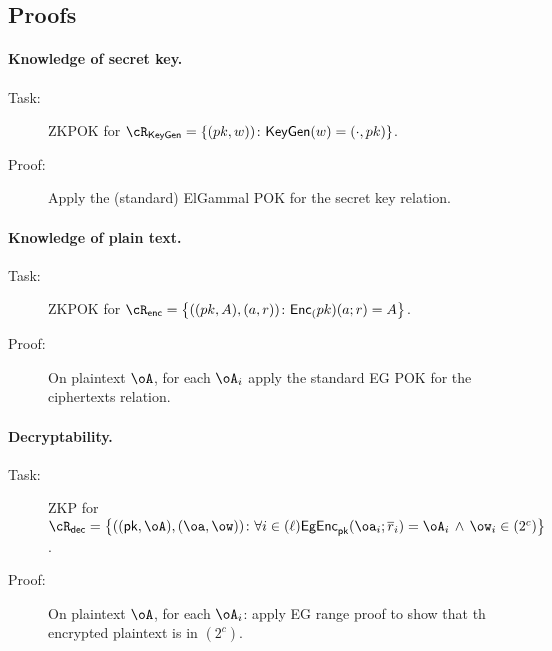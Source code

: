 \subsection{Proofs}\label{sec:ChanksEG:Proofs}

\paragraph{Knowledge of secret key.}   


\begin{description}
	\item[Task:] ZKPOK for $\rKeyGen=\rKeyGenDef$.
	
	\item[Proof:] Apply the (standard) ElGammal POK for the secret key relation.
		
\end{description}


\paragraph{Knowledge of plain text.}  

\newcommand{\rEnc}{{\cR_{\sf enc}}}

\newcommand{\rEncDef}
{
	\set{((pk,A),(a,r))\colon \Enc_(pk)(a;r)= A}
}




\begin{description}
	\item[Task:] ZKPOK for $\rEnc=\rEncDef$.
	
	\item[Proof:] On  plaintext $\oA$, for each $\oA_i$ apply the  standard EG POK for the ciphertexts relation.
	
\end{description}

 


\paragraph{Decryptability.}  
\newcommand{\rDec}{{\cR_{\sf dec}}}
\newcommand{\rDecDef}
{
	\set{((\pk,\oA),(\oa,\ow))\colon \forall i\in (\ell) \EgEnc_\pk(\oa_i;\orr_i)= \oA_i  
	\sland \ow_i \in (2^c)}
}

\begin{description}
	\item[Task:] ZKP for $\rDec =\rDecDef$.
	
	\item[Proof:] On  plaintext $\oA$, for each $\oA_i$: apply EG range proof  to show that th encrypted plaintext is in $(2^c)$.

\end{description}






